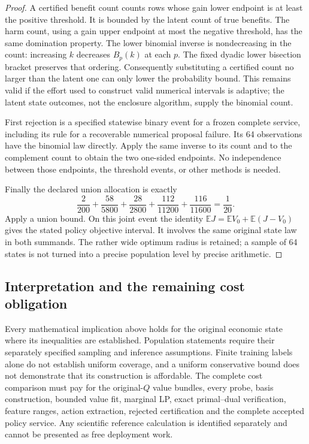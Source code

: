\begin{proof}
A certified benefit count
counts rows whose gain lower
endpoint is at least the
positive threshold.
It is bounded by the latent
count of true benefits.
The harm count, using a gain
upper endpoint at most the
negative threshold, has the
same domination property.
The lower binomial inverse is
nondecreasing in the count:
increasing \(k\) decreases
\(B_p(k)\) at each \(p\).
The fixed dyadic lower
bisection bracket preserves
that ordering.
Consequently substituting a
certified count no larger
than the latent one can only
lower the probability bound.
This remains valid if the
effort used to construct
valid numerical intervals
is adaptive; the latent
state outcomes, not the
enclosure algorithm, supply
the binomial count.

First rejection is a
specified statewise binary
event for a frozen complete
service, including its rule
for a recoverable numerical
proposal failure.
Its 64 observations have
the binomial law directly.
Apply the same inverse to
its count and to the
complement count to obtain
the two one-sided endpoints.
No independence between
those endpoints, the
threshold events, or other
methods is needed.

Finally the declared union
allocation is exactly
\[
 \frac2{200}+\frac{58}{5800}
 +\frac{28}{2800}+\frac{112}{11200}
 +\frac{116}{11600}=\frac1{20}.
\]
Apply a union bound.
On this joint event the
identity
\(\mathbb EJ=\mathbb EV_0+
\mathbb E(J-V_0)\)
gives the stated policy
objective interval.
It involves the same
original state law in both
summands.
The rather wide optimum
radius is retained; a
sample of 64 states is
not turned into a precise
population level by
precise arithmetic.
\end{proof}

\subsection{Interpretation and the remaining cost obligation}

Every mathematical implication above holds
for the original economic state where its
inequalities are established.  Population
statements require their separately specified
sampling and inference assumptions.
Finite training labels alone do not establish
uniform coverage, and a uniform conservative
bound does not demonstrate that its
construction is affordable.
The complete cost comparison must pay for
the original-\(Q\) value bundles, every
probe, basis construction, bounded value
fit, marginal LP, exact primal--dual
verification, feature ranges, action
extraction, rejected certification and
the complete accepted policy service.
Any scientific reference calculation is
identified separately and cannot be
presented as free deployment work.

